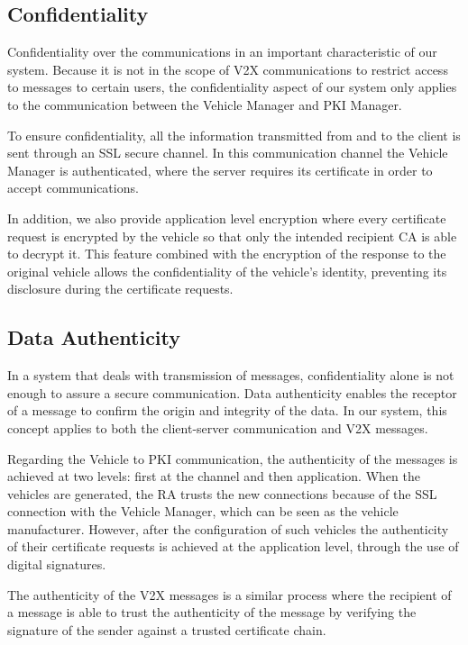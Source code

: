 \subsection{Confidentiality}
Confidentiality over the communications in an important characteristic of our system. Because it is not in the scope of V2X communications to restrict access to messages to certain users, the confidentiality aspect of our system only applies to the communication between the Vehicle Manager and PKI Manager.

To ensure confidentiality, all the information transmitted from and to the client is sent through an SSL secure channel. In this communication channel the Vehicle Manager is authenticated, where the server requires its certificate in order to accept communications. 

In addition, we also provide application level encryption where every certificate request is encrypted by the vehicle so that only the intended recipient CA is able to decrypt it. This feature combined with the encryption of the response to the original vehicle allows the confidentiality of the vehicle's identity, preventing its disclosure during the certificate requests.
 
\subsection{Data Authenticity}
In a system that deals with transmission of messages, confidentiality alone is not enough to assure a secure communication. Data authenticity enables the receptor of a message to confirm the origin and integrity of the data. In our system, this concept applies to both the client-server communication and V2X messages.

Regarding the Vehicle to PKI communication, the authenticity of the messages is achieved at two levels: first at the channel and then application. When the vehicles are generated, the RA trusts the new connections because of the SSL connection with the Vehicle Manager, which can be seen as the vehicle manufacturer. However, after the configuration of such vehicles the authenticity of their certificate requests is achieved at the application level, through the use of digital signatures.

The authenticity of the V2X messages is a similar process where the recipient of a message is able to trust the authenticity of the message by verifying the signature of the sender against a trusted certificate chain. 

